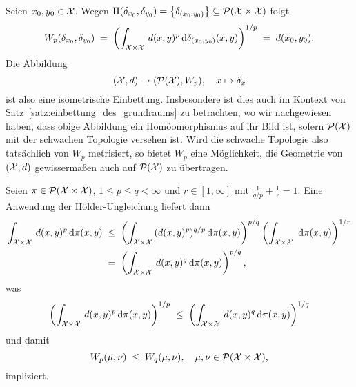 \documentclass[../thesis/thesis.tex]{subfiles}
\begin{document}
	\begin{Bemerkung}
		Seien $x_0, y_0 \in \mathcal{X}$. Wegen $\Pi(\delta_{x_0}, \delta_{y_0}) = \left\{\delta_{(x_0, y_0)}\right\} \subseteq \mathcal{P}(\mathcal{X} \times \mathcal{X})$ folgt
		\[ W_p(\delta_{x_0}, \delta_{y_0}) \; = \; \left( \int_{\mathcal{X} \times \mathcal{X}} \, d(x, y)^p \, \mathrm{d}\delta_{(x_0, y_0)}(x, y) \right)^{1/p} \; = \; d(x_0, y_0) \text{.} \]
		Die Abbildung 
		\[ (\mathcal{X}, d) \to (\mathcal{P}(\mathcal{X}), W_p), \quad x \mapsto \delta_x \]
		ist also eine isometrische Einbettung. Insbesondere ist dies auch im Kontext von Satz~\ref{satz:einbettung_des_grundraums} zu betrachten, wo wir nachgewiesen haben, dass obige Abbildung ein Homöomorphismus auf 
		ihr Bild ist, sofern $\mathcal{P}(\mathcal{X})$ mit der schwachen Topologie versehen ist. Wird die schwache Topologie also tatsächlich von $W_p$ metrisiert, so bietet $W_p$ eine Möglichkeit, die Geometrie von $(\mathcal{X}, d)$ gewissermaßen auch auf $\mathcal{P}(\mathcal{X})$ zu übertragen.
	\end{Bemerkung}

	\begin{Bemerkung}
		Seien $\pi \in \mathcal{P}(\mathcal{X} \times \mathcal{X})$, $1 \leq p \leq q < \infty$ und $r \in [1, \infty]$ mit $\frac{1}{q/p} + \frac{1}{r} = 1$. Eine Anwendung der Hölder-Ungleichung liefert dann
		\begin{align*}
			\int_{\mathcal{X} \times \mathcal{X}} \, d(x, y)^p \, \mathrm{d}\pi(x, y) \; &\leq \; \left( \int_{\mathcal{X} \times \mathcal{X}} \, (d(x, y)^p)^{q/p} \, \mathrm{d}\pi(x, y) \right)^{p/q} \left( \int_{\mathcal{X} \times \mathcal{X}} \,  \, \mathrm{d}\pi(x, y) \right)^{1/r} \\
			                                                    &=    \; \left( \int_{\mathcal{X} \times \mathcal{X}} \, d(x, y)^q \, \mathrm{d}\pi(x, y) \right)^{p/q} \text{,}
		\end{align*}
		was
		\[ \left( \int_{\mathcal{X} \times \mathcal{X}} \, d(x, y)^p \, \mathrm{d}\pi(x, y) \right)^{1/p} \; \leq \; \left( \int_{\mathcal{X} \times \mathcal{X}} \, d(x, y)^q \, \mathrm{d}\pi(x, y) \right)^{1/q} \]
		und damit
		\[ W_p(\mu, \nu) \; \leq \; W_q(\mu, \nu), \quad \mu, \nu \in \mathcal{P}(\mathcal{X} \times \mathcal{X}) \text{,} \]
		impliziert.
	\end{Bemerkung}
\end{document}
